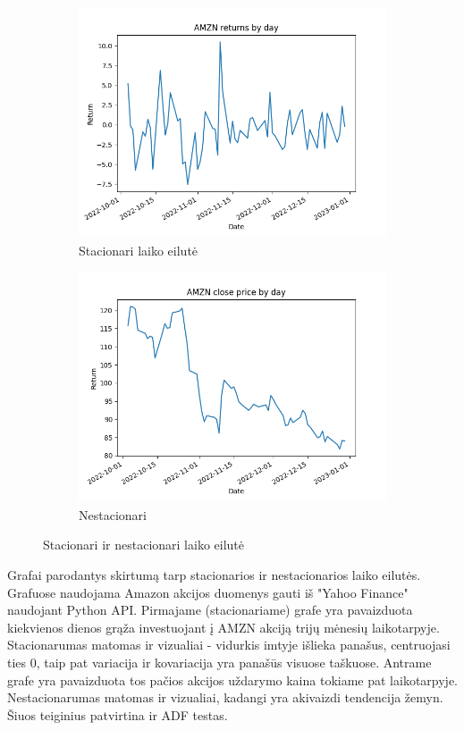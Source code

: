 \documentclass{VUMIFInfKursinis}
\begin{document}
\begin{figure}[H]
  \centering
  \begin{subfigure}{.5\textwidth}
    \centering
    \includegraphics[width=.6\linewidth]{img/AMZN_daily_return.png}
    \caption{Stacionari laiko eilutė}
    \label{fig:sub1}
  \end{subfigure}%
  \begin{subfigure}{.5\textwidth}
    \centering
    \includegraphics[width=.6\linewidth]{img/AMZN_daily_close.png}
    \caption{Nestacionari}
    \label{fig:sub2}
  \end{subfigure}
  \caption{Stacionari ir nestacionari laiko eilutė}
  \label{fig:test}
\end{figure}

Grafai parodantys skirtumą tarp stacionarios ir nestacionarios laiko eilutės. Grafuose naudojama Amazon akcijos duomenys gauti iš "Yahoo Finance" naudojant Python API\cite{yfinance}.
Pirmajame (stacionariame) grafe yra pavaizduota kiekvienos dienos grąža investuojant į AMZN akciją trijų mėnesių laikotarpyje. 
Stacionarumas matomas ir vizualiai - vidurkis imtyje išlieka panašus, centruojasi ties 0, taip pat
variacija ir kovariacija yra panašūs visuose taškuose. Antrame grafe yra pavaizduota tos pačios akcijos uždarymo kaina tokiame pat laikotarpyje. 
Nestacionarumas matomas ir vizualiai, kadangi yra akivaizdi tendencija žemyn. Šiuos teiginius patvirtina ir ADF testas. %
\end{document}

